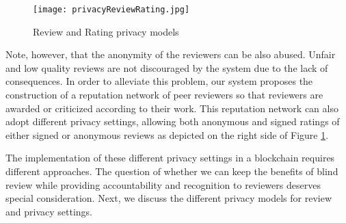 \begin{figure}[!th]
  \texttt{[image: privacyReviewRating.jpg]}
  \centering \caption{Review and Rating privacy models}
  \label{PrivacyReviewRating}
\end{figure}

Note, however, that the anonymity of the reviewers can be also abused. Unfair
and low quality reviews are not discouraged by the system due to the lack of
consequences. In order to alleviate this problem, our system proposes the
construction of a reputation network of peer reviewers so that reviewers are
awarded or criticized according to their work. This reputation network can also
adopt different privacy settings, allowing both anonymous and signed ratings of
either signed or anonymous reviews as depicted on the right side of Figure
\ref{PrivacyReviewRating}.

The implementation of these different privacy settings in a blockchain requires
different approaches. The question of whether we can keep the benefits of blind
review while providing accountability and recognition to reviewers deserves
special consideration. Next, we discuss the different privacy models for review
and privacy settings.





